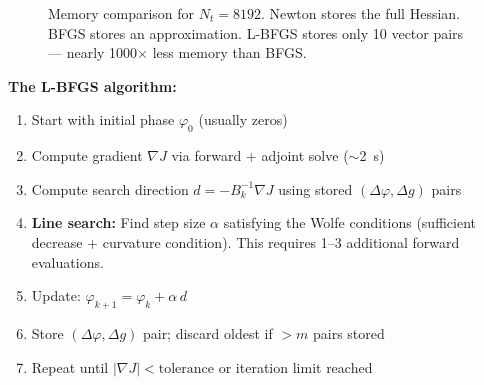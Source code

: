 \documentclass[12pt,a4paper]{article}
\begin{document}
\begin{figure}[H]
\centering
{}
\caption{Memory comparison for $N_t = 8192$. Newton stores the full Hessian. BFGS stores an approximation. L-BFGS stores only 10 vector pairs --- nearly 1000$\times$ less memory than BFGS.}
\label{fig:memory}
\end{figure}

\begin{keyeq}
\textbf{The L-BFGS algorithm:}
\begin{enumerate}[leftmargin=*]
    \item Start with initial phase $\varphi_0$ (usually zeros)
    \item Compute gradient $\nabla J$ via forward + adjoint solve ($\sim$2~s)
    \item Compute search direction $d = -B_k^{-1}\nabla J$ using stored $(\Delta\varphi, \Delta g)$ pairs
    \item \textbf{Line search:} Find step size $\alpha$ satisfying the Wolfe conditions (sufficient decrease + curvature condition). This requires 1--3 additional forward evaluations.
    \item Update: $\varphi_{k+1} = \varphi_k + \alpha\,d$
    \item Store $(\Delta\varphi, \Delta g)$ pair; discard oldest if $> m$ pairs stored
    \item Repeat until $|\nabla J| < \text{tolerance}$ or iteration limit reached
\end{enumerate}
\end{keyeq}
\end{document}
